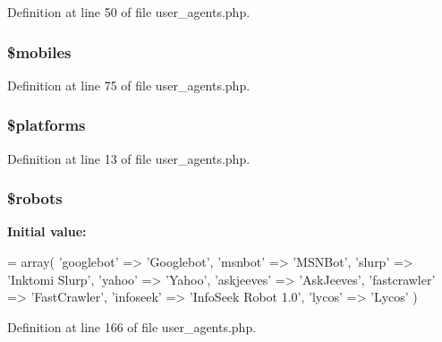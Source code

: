 Definition at line 50 of file user\-\_\-agents.\-php.

\subsubsection[{\$mobiles}]{\setlength{\rightskip}{0pt plus 5cm}\$mobiles}\label{user__agents_8php_a6928dde5aa0be443766d5b2376de908a}


Definition at line 75 of file user\-\_\-agents.\-php.

\subsubsection[{\$platforms}]{\setlength{\rightskip}{0pt plus 5cm}\$platforms}\label{user__agents_8php_a1c1a0a860242698ee6b3f4ef7d6eb343}


Definition at line 13 of file user\-\_\-agents.\-php.

\subsubsection[{\$robots}]{\setlength{\rightskip}{0pt plus 5cm}\$robots}\label{user__agents_8php_a5752e2a66d1c03bc34666492746037ab}
{\bfseries Initial value\-:}
\begin{DoxyCode}
= array(
                    \textcolor{stringliteral}{'googlebot'}         => \textcolor{stringliteral}{'Googlebot'},
                    \textcolor{stringliteral}{'msnbot'}            => \textcolor{stringliteral}{'MSNBot'},
                    \textcolor{stringliteral}{'slurp'}             => \textcolor{stringliteral}{'Inktomi Slurp'},
                    \textcolor{stringliteral}{'yahoo'}             => \textcolor{stringliteral}{'Yahoo'},
                    \textcolor{stringliteral}{'askjeeves'}         => \textcolor{stringliteral}{'AskJeeves'},
                    \textcolor{stringliteral}{'fastcrawler'}       => \textcolor{stringliteral}{'FastCrawler'},
                    \textcolor{stringliteral}{'infoseek'}          => \textcolor{stringliteral}{'InfoSeek Robot 1.0'},
                    \textcolor{stringliteral}{'lycos'}             => \textcolor{stringliteral}{'Lycos'}
                )
\end{DoxyCode}


Definition at line 166 of file user\-\_\-agents.\-php.

